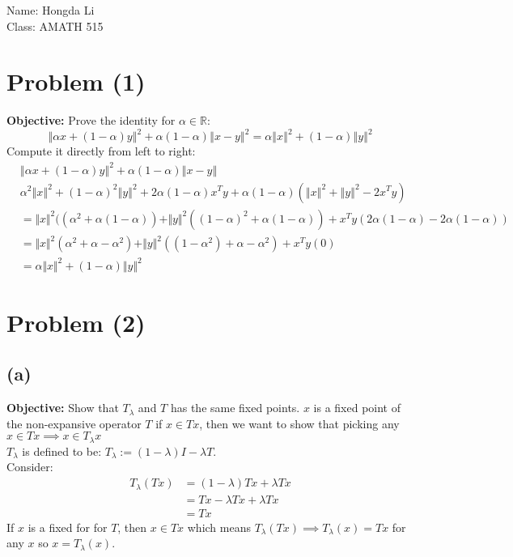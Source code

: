 \documentclass[]{article}
\begin{document}
\hspace{-1.8em}
Name: Hongda Li
\\
Class: AMATH 515

\section*{Problem (1)}
    \textbf{Objective:} Prove the identity for $\alpha \in \mathbb{R}$:
    $$
        \left\Vert
            \alpha x + (1 - \alpha)y
        \right\Vert^2 + \alpha(1 - \alpha)\left\Vert
            x - y
        \right\Vert^2 = \alpha\left\Vert
            x
        \right\Vert^2 +(1 - \alpha)\left\Vert
            y
        \right\Vert^2
    $$
    Compute it directly from left to right: 
    \begin{align*}\tag{1}\label{eqn:1}
    &\left\Vert
        \alpha x + (1 - \alpha)y
    \right\Vert^2
    + 
    \alpha(1- \alpha) \left\Vert
        x - y
    \right\Vert
    \\
    & \alpha^2 \left\Vert
        x
    \right\Vert^2 
    + 
    (1 - \alpha)^2 \left\Vert
        y
    \right\Vert^2
    +
    2\alpha(1 - \alpha)x^Ty + \alpha(1 - \alpha)(\left\Vert
        x
    \right\Vert^2 + \left\Vert
            y
    \right\Vert^2 - 2x^Ty)
    \\
    &= 
    \Vert x\Vert^2((\alpha^2 + \alpha(1 - \alpha)) 
    + 
    \Vert y\Vert^2 ((1 - \alpha)^2 + \alpha(1 - \alpha))
    + 
    x^Ty(2\alpha(1 - \alpha) - 2\alpha(1 - \alpha))
    \\
    &= 
    \Vert x\Vert^2(\alpha^2 + \alpha - \alpha^2) 
    + 
    \Vert y\Vert^2 ((1 - \alpha^2)+ \alpha - \alpha^2)
    + 
    x^Ty(0)
    \\
    &=\alpha \Vert x\Vert^2 + (1 - \alpha)\Vert y\Vert^2
    \end{align*}
\section*{Problem (2)}
    \subsection*{(a)}
        \textbf{Objective: }Show that $T_\lambda$ and $T$ has the same fixed points. $x$ is a fixed point of the non-expansive operator $T$ if $x \in Tx$, then we want to show that picking any $x\in Tx\implies x\in T_\lambda x$
        \\
        $T_\lambda$ is defined to be: $T_\lambda:= (1 - \lambda)I - \lambda T$. 
        \\
        Consider: 
        \begin{align*}\tag{2a1}\label{eqn:2a1}
        T_\lambda(Tx) 
        &= (1 - \lambda)Tx + \lambda Tx
        \\
        &= Tx - \lambda Tx + \lambda Tx
        \\
        &=Tx
        \end{align*}
        If $x$ is a fixed for for $T$, then $x \in Tx$ which means $T_\lambda(Tx) \implies T_\lambda(x) = Tx $ for any $x$ so $x = T_\lambda(x)$.
\end{document}
